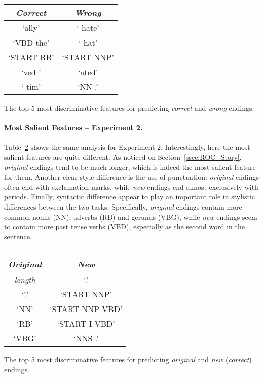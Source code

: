 \documentclass[11pt,a4paper]{article}
\newcommand{\secref}[1]{Section~\ref{ssec:#1}}
\newcommand{\tabref}[1]{Table~\ref{#1}}
\begin{document}
\begin{table}[!t]
\begin{center}
\begin{tabular}{|c|c|} \hline
\textit{\textbf{Correct}} & \textit{\textbf{Wrong}}\\ \hline
`ally' & ` hate'\\ \hline
`VBD the' & ` hat'\\ \hline
`START RB' & `START NNP'\\ \hline
`ved ' & `ated'\\ \hline
` tim' & `NN .'\\ \hline

\end{tabular}
\end{center}
\caption{\label{exp1_features}}
The top 5 most discriminative features for predicting {\it correct} and {\it wrong} endings.\end{table}


\paragraph{Most Salient Features -- Experiment 2.}
\tabref{exp2_features} shows the same analysis for Experiment 2.
Interestingly, here the most salient features are quite different. 
As noticed on \secref{ROC_Story}, {\it original} endings tend to be much longer, which is indeed the most salient feature for them.
Another clear style difference is the use of punctuation: {\it original} endings often end with exclamation marks, while {\it new} endings end almost exclusively with periods. 
Finally, syntactic difference appear to play an important role in stylistic differences between the two tasks. 
Specifically, {\it original} endings contain more common nouns (NN), adverbs (RB) and gerunds (VBG), while {\it new} endings seem to contain more past tense verbs (VBD), especially as the second word in the sentence.


\begin{table}[!t]
\begin{center}
\begin{tabular}{|c|c|} \hline
\textit{\textbf{Original}} & \textit{\textbf{New}}\\ \hline
{\it length} & `.'\\ \hline
`!' & `START NNP'\\ \hline
`NN' & `START NNP VBD'\\ \hline
`RB' & `START I VBD'\\ \hline
`VBG' & `NNS .'\\ \hline

\end{tabular}
\end{center}
\caption{\label{exp2_features}}
The top 5 most discriminative features for predicting {\it original} and {\it new} ({\it correct}) endings.\end{table}
\end{document}
